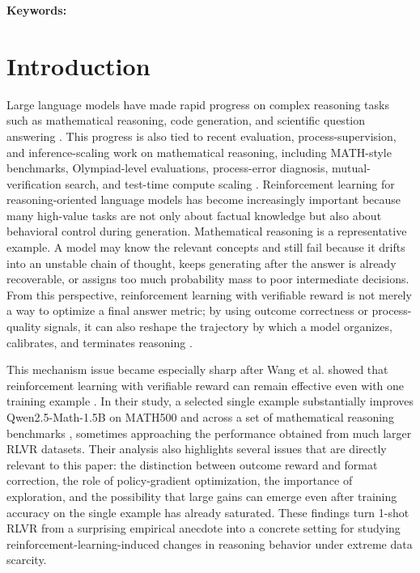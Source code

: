 \documentclass[12pt,a4paper]{ctexart}
\begin{document}
\noindent\textbf{Keywords:} \ReportKeywordsEN

\tableofcontents
\clearpage
{}

\section{Introduction}

Large language models have made rapid progress on complex reasoning tasks such as mathematical reasoning, code generation, and scientific question answering \cite{deepseekr1,kimi15,deepseekmath,qwen,openmathinstruct1,openmathinstruct2,mammoth2}. This progress is also tied to recent evaluation, process-supervision, and inference-scaling work on mathematical reasoning, including MATH-style benchmarks, Olympiad-level evaluations, process-error diagnosis, mutual-verification search, and test-time compute scaling \cite{math,omnimath,processbench2024,rstar2024,testtimecompute2024,s1scaling2025}. Reinforcement learning for reasoning-oriented language models has become increasingly important because many high-value tasks are not only about factual knowledge but also about behavioral control during generation. Mathematical reasoning is a representative example. A model may know the relevant concepts and still fail because it drifts into an unstable chain of thought, keeps generating after the answer is already recoverable, or assigns too much probability mass to poor intermediate decisions. From this perspective, reinforcement learning with verifiable reward is not merely a way to optimize a final answer metric; by using outcome correctness or process-quality signals, it can also reshape the trajectory by which a model organizes, calibrates, and terminates reasoning \cite{deepseekr1,automatedprocess2024,stepdpo2024,deepseekprover15,wang2025oneshotrlvr}.

This mechanism issue became especially sharp after Wang et al. showed that reinforcement learning with verifiable reward can remain effective even with one training example \cite{wang2025oneshotrlvr}. In their study, a selected single example substantially improves Qwen2.5-Math-1.5B on MATH500 and across a set of mathematical reasoning benchmarks \cite{qwen,math}, sometimes approaching the performance obtained from much larger RLVR datasets. Their analysis also highlights several issues that are directly relevant to this paper: the distinction between outcome reward and format correction, the role of policy-gradient optimization, the importance of exploration, and the possibility that large gains can emerge even after training accuracy on the single example has already saturated. These findings turn 1-shot RLVR from a surprising empirical anecdote into a concrete setting for studying reinforcement-learning-induced changes in reasoning behavior under extreme data scarcity.
\end{document}
